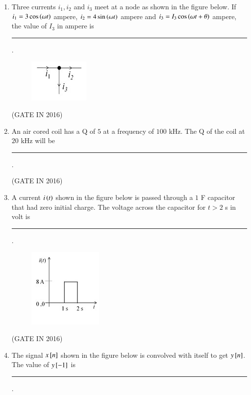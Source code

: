 \documentclass[journal,12pt,onecolumn]{IEEEtran}
\theoremstyle{remark}
\begin{document}
\begin{enumerate}
\item Three currents $i_1, i_2$ and $i_3$ meet at a node as shown in the figure below. If $i_1 = 3 \cos\left(\omega t\right)$ ampere, $i_2 = 4 \sin\left(\omega t\right)$ ampere and $i_3 = I_3 \cos\left(\omega t + \theta\right)$ ampere, the value of $I_3$ in ampere is \rule{2cm}{0.4pt}.

\begin{figure}[h!]
\centering
\includegraphics[width=0.2\columnwidth]{figs/z2.jpg}
\caption*{}
\label{fig:z2}
\end{figure}


\hfill{(GATE IN 2016)}

\item An air cored coil has a Q of $5$ at a frequency of $100$ kHz. The Q of the coil at $20$ kHz  will be \rule{2cm}{0.4pt}.

\hfill{(GATE IN 2016)}

\item A current $i\left(t\right)$ shown in the figure below is passed through a $1$ F capacitor that had zero initial charge. The voltage across the capacitor for $t > 2$ s in volt is \rule{2cm}{0.4pt}.

\begin{figure}[H]
\centering
\includegraphics[width=0.4\columnwidth]{figs/z3.jpg}
\caption*{}
\label{fig:z3}
\end{figure}

\hfill{(GATE IN 2016)}

\item The signal $x{}\left[n\right]$ shown in the figure below is convolved with itself to get $y{}\left[n\right]$. The value of $y{}\left[-1\right]$ is \rule{2cm}{0.4pt}.


\end{enumerate}
\end{document}
